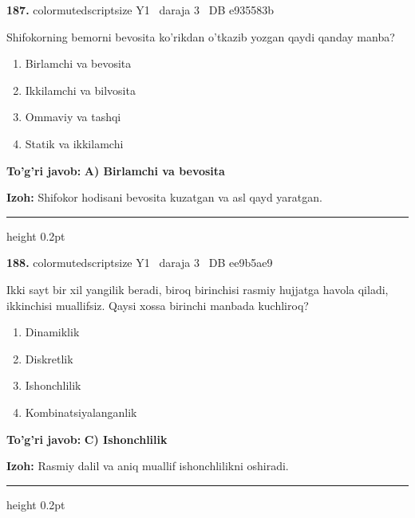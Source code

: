 \documentclass[10pt,a4paper,oneside]{article}
\begin{document}
\noindent\textbf{\color{ink}187.}  {color{muted}scriptsize Y1 \textbullet\ daraja 3 \textbullet\ DB e935583b}
\par
Shifokorning bemorni bevosita ko'rikdan o'tkazib yozgan qaydi qanday manba?
\begin{enumerate}[label=\Alph*),leftmargin=9mm]
\item Birlamchi va bevosita
\item Ikkilamchi va bilvosita
\item Ommaviy va tashqi
\item Statik va ikkilamchi
\end{enumerate}
\begin{tcolorbox}[enhanced,breakable,colback=teal!4,colframe=teal!50!black,boxrule=0.5pt,arc=1.1mm,left=3mm,right=3mm,top=1.7mm,bottom=1.7mm,before skip=2mm,after skip=2mm]
\textbf{\color{teal}To'g'ri javob:} \textbf{A) Birlamchi va bevosita}
\par\smallskip
\textbf{Izoh:} Shifokor hodisani bevosita kuzatgan va asl qayd yaratgan.
\end{tcolorbox}
\vspace{2mm}\hrule height 0.2pt \vspace{3mm}

\noindent\textbf{\color{ink}188.}  {color{muted}scriptsize Y1 \textbullet\ daraja 3 \textbullet\ DB ee9b5ae9}
\par
Ikki sayt bir xil yangilik beradi, biroq birinchisi rasmiy hujjatga havola qiladi, ikkinchisi muallifsiz. Qaysi xossa birinchi manbada kuchliroq?
\begin{enumerate}[label=\Alph*),leftmargin=9mm]
\item Dinamiklik
\item Diskretlik
\item Ishonchlilik
\item Kombinatsiyalanganlik
\end{enumerate}
\begin{tcolorbox}[enhanced,breakable,colback=teal!4,colframe=teal!50!black,boxrule=0.5pt,arc=1.1mm,left=3mm,right=3mm,top=1.7mm,bottom=1.7mm,before skip=2mm,after skip=2mm]
\textbf{\color{teal}To'g'ri javob:} \textbf{C) Ishonchlilik}
\par\smallskip
\textbf{Izoh:} Rasmiy dalil va aniq muallif ishonchlilikni oshiradi.
\end{tcolorbox}
\vspace{2mm}\hrule height 0.2pt \vspace{3mm}
\end{document}
